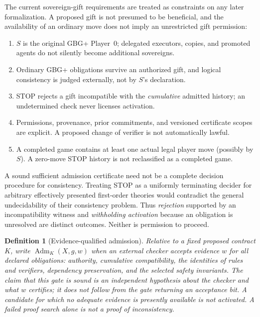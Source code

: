 \documentclass[11pt,letterpaper]{article}
\newtheorem{definition}{Definition}[section]
\theoremstyle{remark}
\newcommand{\Adm}{\operatorname{Adm}}
\begin{document}
The current sovereign-gift requirements are treated as constraints on any later formalization. A proposed gift is not presumed to be beneficial, and the availability of an ordinary move does not imply an unrestricted gift permission:
\begin{enumerate}
\item $S$ is the original GBG+ Player~0; delegated executors, copies, and promoted agents do not silently become additional sovereigns.
\item Ordinary GBG+ obligations survive an authorized gift, and logical consistency is judged externally, not by $S$'s declaration.
\item STOP rejects a gift incompatible with the \emph{cumulative} admitted history; an undetermined check never licenses activation.
\item Permissions, provenance, prior commitments, and versioned certificate scopes are explicit. A proposed change of verifier is not automatically lawful.
\item A completed game contains at least one actual legal player move (possibly by $S$). A zero-move STOP history is not reclassified as a completed game.
\end{enumerate}
A sound sufficient admission certificate need not be a complete decision procedure for consistency. Treating STOP as a uniformly terminating decider for arbitrary effectively presented first-order theories would contradict the general undecidability of their consistency problem. Thus \emph{rejection} supported by an incompatibility witness and \emph{withholding activation} because an obligation is unresolved are distinct outcomes. Neither is permission to proceed.

\begin{definition}[Evidence-qualified admission]\label{def:admit}
Relative to a fixed proposed contract $K$, write $\Adm_K(X,g,w)$ when an external checker accepts evidence $w$ for all declared obligations: authority, cumulative compatibility, the identities of rules and verifiers, dependency preservation, and the selected safety invariants. The claim that this gate is \emph{sound} is an independent hypothesis about the checker and what $w$ certifies; it does not follow from the gate returning an acceptance bit. A candidate for which no adequate evidence is presently available is \emph{not activated}. A failed proof search alone is not a proof of inconsistency.
\end{definition}
\end{document}
